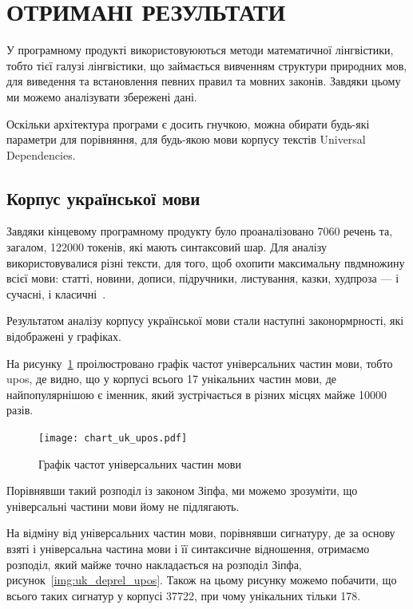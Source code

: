 \section{ОТРИМАНІ РЕЗУЛЬТАТИ}

У програмному продукті використовуюються методи математичної лінгвістики,
тобто тієї галузі лінгвістики,
що займається вивченням структури природних мов, для виведення та встановлення
певних правил та мовних законів. Завдяки цьому ми можемо аналізувати збережені дані.

Оскільки архітектура програми є досить гнучкою, можна обирати будь-які
параметри для порівняння, для будь-якою мови корпусу текстів Universal
Dependencies.

\subsection{Корпус української мови}
Завдяки кінцевому програмному продукту було проаналізовано 7060 речень 
та, загалом, 122000 токенів, які мають синтаксовий шар.
Для аналізу використовувалися різні тексти, для того, щоб охопити максимальну
пвдмножину всієї мови: статті, новини, дописи, підручники, листування, казки, худпроза — і сучасні, і класичні~\cite{bib12}.

Результатом аналізу корпусу української мови стали наступні законормрності,
які відображені у графіках.

На рисунку~\ref{img:uk_upos} проілюстровано графік частот універсальних
частин мови, тобто upos, де видно, що у корпусі всього 17 унікальних
частин мови, де найпопулярнішою є іменник, який зустрічається в різних
місцях майже 10000 разів.

\begin{figure}[ht]
  \begin{center}
    \texttt{[image: chart\_uk\_upos.pdf]}
  \end{center}
  \caption{Графік частот універсальних частин мови}
  \label{img:uk_upos}
\end{figure}

\newpage
Порівнявши такий розподіл із законом Зіпфа, ми можемо зрозуміти, що
універсальні частини мови йому не підлягають.

На відміну від універсальних частин мови, порівнявши сигнатуру, де за основу
взяті і універсальна частина мови і її синтаксичне відношення, отримаємо
розподіл, який майже точно накладається на розподіл Зіпфа, рисунок~\ref{img:uk_deprel_upos}. Також на цьому рисунку можемо побачити, що 
всього таких сигнатур у корпусі 37722, при чому унікальних
тільки 178.

